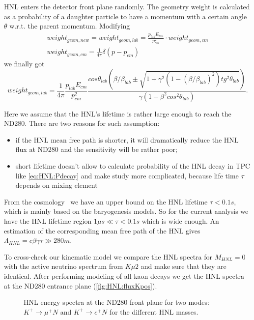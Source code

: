 \documentclass[../main.tex]{subfiles}
\begin{document}
HNL enters the detector front plane randomly. The geometry weight is calculated as a probability of a daughter particle to have a momentum with a certain angle $\theta$ w.r.t. the parent momentum. Modifying
\begin{eqnarray}
    weight_{geom,new}=weight_{geom, lab}=\frac{p_{lab}E_{cm}}{p_{cm}^2}\cdot weight_{geom,cm}
    \nonumber \\
    weight_{geom, cm} = \frac{1}{4\pi}\delta\left(p-p_{cm}\right)
\end{eqnarray}
we finally got
\begin{equation}
    weight_{geom, lab}=\frac{1}{4\pi}\frac{p_{lab}E_{cm}}{p_{cm}^2}\frac{cos\theta_{lab}\left(\beta/\beta_{lab}\pm\sqrt{1+\gamma^2\left(1-\left(\beta/\beta_{lab}\right)^2\right)tg^2\theta_{lab}}\right)}{\gamma\left(1-\beta^{2}cos^{2}\theta_{lab}\right)}.
    \label{eq:HNL:lorentz}
\end{equation}

Here we assume that the HNL's lifetime is rather large enough to reach the ND280. There are two reasons for such assumption:
\begin{itemize}
    \item if the HNL mean free path is shorter, it will dramatically reduce the HNL flux at ND280 and the sensitivity will be rather poor;
    \item short lifetime doesn't allow to calculate probability of the HNL decay in TPC like \autoref{eq:HNL:Pdecay} and make study more complicated, because life time $\tau$ depends on mixing element
\end{itemize}
From the cosmology~\cite{Gorbunov2007} we have an upper bound on the HNL lifetime  $\tau < 0.1s$, which is mainly based on the baryogenesis models. So for the current analysis we have the HNL lifetime region $1\mu s\ll\tau<0.1s$ which is wide enough. An estimation of the corresponding mean free path of the HNL gives $\Lambda_{HNL}=c\beta\gamma\tau\gg280 m$.

To cross-check our kinematic model we compare the HNL spectra for $M_{HNL}=0$ with the active neutrino spectrum from $K\mu2$ and make sure that they are identical. After performing modeling of all kaon decays we get the HNL spectra at the ND280 entrance plane (\autoref{fig:HNL:fluxKpos}).
\begin{figure}[!ht]
    \begin{minipage}{0.49\linewidth}
    \end{minipage}
    \hfill
    \begin{minipage}{0.49\linewidth}
    \end{minipage}
    \caption{HNL energy spectra at the ND280 front plane for two modes: $K^+\rightarrow \mu^+N$ and $K^+\rightarrow e^+N$ for the different HNL masses.}
    \label{fig:HNL:fluxKpos}
\end{figure}
\end{document}
